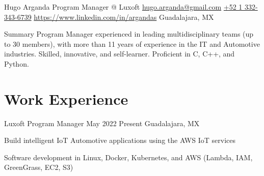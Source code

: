 \documentclass{resume} %
\begin{document}

\customheader
    {Hugo Arganda}
    {Program Manager @ Luxoft}
    {\href{mailto:hugo.arganda@gmail.com}{hugo.arganda@gmail.com}}
    {\href{https://wa.me/5213323436739}{+52 1 332-343-6739}}
    {\href{https://www.linkedin.com/in/argandas}{https://www.linkedin.com/in/argandas}}
    {Guadalajara, MX}



\summary
{Summary}
    {Program Manager experienced in leading multidisciplinary teams (up to 30 members), with more than 11 years of experience in the IT and Automotive industries. Skilled, innovative, and self-learner. Proficient in C, C++, and Python.}



\section{Work Experience}


\job
    {Luxoft}
    {Program Manager}
    {May 2022}
    {Present}
    {Guadalajara, MX}
    {
    \begin{itemize-bullets}
    \item{Build intelligent IoT Automotive applications using the AWS IoT services}
    \item{Software development in Linux, Docker, Kubernetes, and AWS (Lambda, IAM, GreenGrass, EC2, S3)}
    \end{itemize-bullets}
    }
\end{document}
